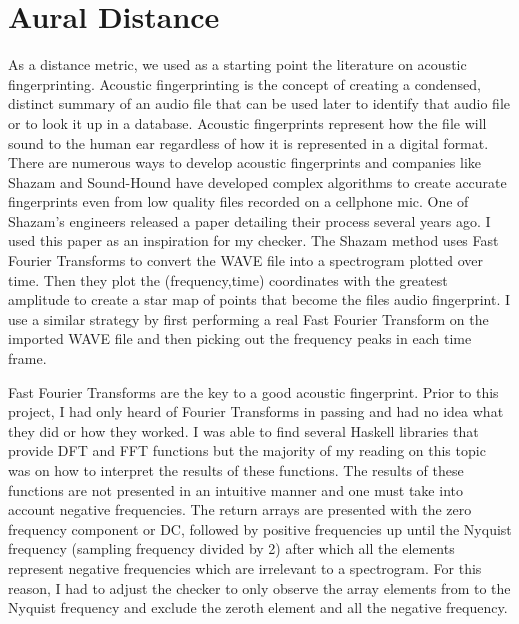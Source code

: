 
\section{Aural Distance}

As a distance metric, we used as a starting point the literature on acoustic fingerprinting.
Acoustic fingerprinting is the concept of creating a condensed, distinct summary of an audio file that can be used later to identify that audio file or to look it up in a database.
Acoustic fingerprints represent how the file will sound to the human ear regardless of how it is represented in a digital format.
There are numerous ways to develop acoustic fingerprints and companies like Shazam and Sound-Hound have developed complex algorithms to create accurate fingerprints even from low quality files recorded on a cellphone mic.
One of Shazam’s engineers released a paper detailing their process several years ago.
I used this paper as an inspiration for my checker.
The Shazam method uses Fast Fourier Transforms to convert the WAVE file into a spectrogram plotted over time.
Then they plot the (frequency,time) coordinates with the greatest amplitude to create a star map of points that become the files audio fingerprint.
I use a similar strategy by first performing a real Fast Fourier Transform on the imported WAVE file and then picking out the frequency peaks in each time frame.


Fast Fourier Transforms are the key to a good acoustic fingerprint.
Prior to this project, I had only heard of Fourier Transforms in passing and had no idea what they did or how they worked.
I was able to find several Haskell libraries that provide DFT and FFT functions but the majority of my reading on this topic was on how to interpret the results of these functions.
The results of these functions are not presented in an intuitive manner and one must take into account negative frequencies.
The return arrays are presented with the zero frequency component or DC, followed by positive frequencies up until the Nyquist frequency (sampling frequency divided by 2) after which all the elements represent negative frequencies which are irrelevant to a spectrogram.
For this reason, I had to adjust the checker to only observe the array elements from to the Nyquist frequency and exclude the zeroth element and all the negative frequency.

